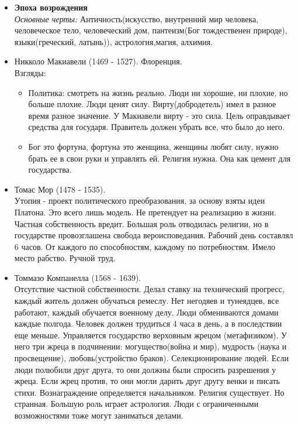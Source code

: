 \documentclass[a4paper,12pt]{report} %
\begin{document}
\begin{itemize}
\item \textbf{Эпоха возрождения}
  \\ 
  \textit{Основные черты: } Античность(искусство, внутренний мир человека, человеческое тело,
  человеческий дом, пантеизм(Бог тождественен природе), языки(греческий,
  латынь)), астрология,магия, алхимия.
\item Никколо Макиавели (1469 - 1527). Флоренция. \\
  Взгляды:
  \begin{itemize}
  \item Политика: смотреть на жизнь реально. Люди ни хорошие, ни плохие,
    но больше плохие. Люди ценят силу. Вирту(добродетель) имел в разное
    время разное значение. У Макиавели вирту - это сила. Цель
    оправдывает средства для государя. Правитель должен убрать все, что
    было до него.
  \item Бог это фортуна, фортуна это женщина, женщины любят силу, нужно
    брать ее в свои руки и управлять ей. Религия нужна. Она как цемент
    для государства.
  \end{itemize}
\item Томас Мор (1478 - 1535). \\
  Утопия - проект политического преобразования, за основу взяты идеи
  Платона. Это всего лишь модель. Не претендует на реализацию в
  жизни. Частная собственность вредит. Большая роль отводилась религии,
  но в государстве провозглашена свобода вероисповедания. Рабочий день
  составлял 6 часов. От каждого по способностям, каждому по
  потребностям. Имело место рабство. Ручной труд.
\item Томмазо Компанелла (1568 - 1639). \\
  Отсутствие частной собственности. Делал ставку на технический
  прогресс, каждый житель должен обучаться ремеслу. Нет негодяев и
  тунеядцев, все работают, каждый обучается военному делу. Люди
  обмениваются домами каждые полгода. Человек должен трудиться 4 часа в
  день, а в последствии еще меньше. Управляется государство верховным
  жрецом (метафизиком). У него три жреца в подчинении: могущество(война и мир), мудрость (наука и
  просвещение), любовь(устройство браков). Селекционирование людей. Если
  люди полюбили друг друга, то они должны были спросить разрешения у
  жреца. Если жрец против, то они могли дарить друг другу венки и писать
  стихи. Вознаграждение определяется начальником. Религия существует. Но
  странная. Большую роль играет астрология. Люди с ограниченными
  возможностями тоже могут заниматься делами.\\

\end{itemize}
\end{document}
